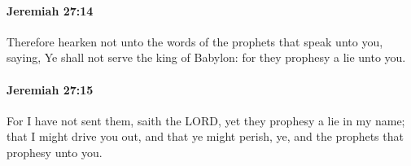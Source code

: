 		\paragraph{Jeremiah 27:14} %
			\label{JEREMIAH-27-14}

			Therefore hearken not unto the words of the prophets that speak unto you, saying, Ye shall not serve the king of Babylon: for they prophesy a lie unto you.


		\paragraph{Jeremiah 27:15} %
			\label{JEREMIAH-27-15}

			For I have not sent them, saith the LORD, yet they prophesy a lie in my name; that I might drive you out, and that ye might perish, ye, and the prophets that prophesy unto you.



